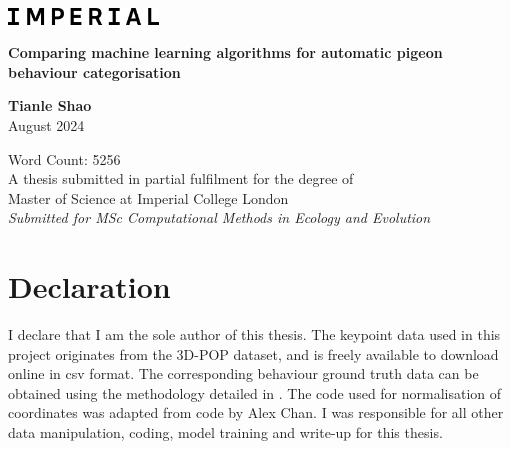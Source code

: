 \documentclass[11pt, letterpaper]{article} %
\begin{document}

\begin{titlepage}
    \includegraphics[width=4cm]{logo_new.png} %
    
    \centering
    
    \vspace{3.5cm}
    \Huge
    \textbf{Comparing machine learning algorithms for automatic pigeon behaviour categorisation}
    
    \vspace{2cm} %
    \huge %
    \textbf{Tianle Shao} \\

    \vspace{0.5cm}
    \Large
    August 2024

    \vspace{6cm} %
    \normalsize
    Word Count: 5256 \\
    \vspace{1cm}
    A thesis submitted in partial fulfilment for the degree of \\
    Master of Science at Imperial College London \\

    \vspace{1cm}
    \textit{Submitted for MSc Computational Methods in Ecology and Evolution} \\

\end{titlepage}



\doublespacing
\section*{Declaration}

I declare that I am the sole author of this thesis. The keypoint data used in this project originates from the 3D-POP dataset, and is freely available to download online in csv format. The corresponding behaviour ground truth data can be obtained using the methodology detailed in \citet{delacoux_fine-scale_2024}. The code used for normalisation of coordinates was adapted from code by Alex Chan. I was responsible for all other data manipulation, coding, model training and write-up for this thesis.
\end{document}
